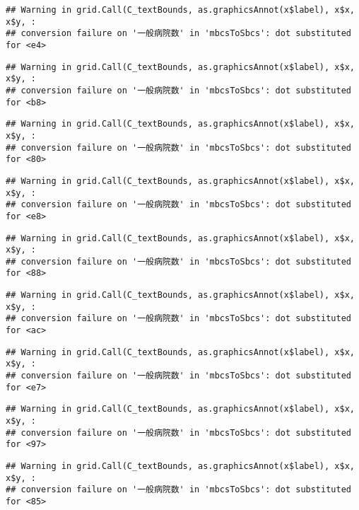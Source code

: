 \documentclass[
]{article}
\begin{document}
\begin{verbatim}
## Warning in grid.Call(C_textBounds, as.graphicsAnnot(x$label), x$x, x$y, :
## conversion failure on '一般病院数' in 'mbcsToSbcs': dot substituted for <e4>
\end{verbatim}

\begin{verbatim}
## Warning in grid.Call(C_textBounds, as.graphicsAnnot(x$label), x$x, x$y, :
## conversion failure on '一般病院数' in 'mbcsToSbcs': dot substituted for <b8>
\end{verbatim}

\begin{verbatim}
## Warning in grid.Call(C_textBounds, as.graphicsAnnot(x$label), x$x, x$y, :
## conversion failure on '一般病院数' in 'mbcsToSbcs': dot substituted for <80>
\end{verbatim}

\begin{verbatim}
## Warning in grid.Call(C_textBounds, as.graphicsAnnot(x$label), x$x, x$y, :
## conversion failure on '一般病院数' in 'mbcsToSbcs': dot substituted for <e8>
\end{verbatim}

\begin{verbatim}
## Warning in grid.Call(C_textBounds, as.graphicsAnnot(x$label), x$x, x$y, :
## conversion failure on '一般病院数' in 'mbcsToSbcs': dot substituted for <88>
\end{verbatim}

\begin{verbatim}
## Warning in grid.Call(C_textBounds, as.graphicsAnnot(x$label), x$x, x$y, :
## conversion failure on '一般病院数' in 'mbcsToSbcs': dot substituted for <ac>
\end{verbatim}

\begin{verbatim}
## Warning in grid.Call(C_textBounds, as.graphicsAnnot(x$label), x$x, x$y, :
## conversion failure on '一般病院数' in 'mbcsToSbcs': dot substituted for <e7>
\end{verbatim}

\begin{verbatim}
## Warning in grid.Call(C_textBounds, as.graphicsAnnot(x$label), x$x, x$y, :
## conversion failure on '一般病院数' in 'mbcsToSbcs': dot substituted for <97>
\end{verbatim}

\begin{verbatim}
## Warning in grid.Call(C_textBounds, as.graphicsAnnot(x$label), x$x, x$y, :
## conversion failure on '一般病院数' in 'mbcsToSbcs': dot substituted for <85>
\end{verbatim}
\end{document}
